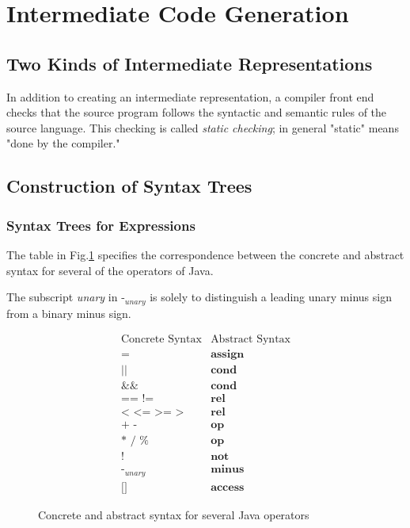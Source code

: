 \documentclass[a4paper,twoside]{book}
\begin{document}
\section{Intermediate Code Generation}
\subsection{Two Kinds of Intermediate Representations}

In addition to creating an intermediate representation, a compiler front end checks that the source program follows the syntactic and semantic rules of the source language. This checking is called \textit{static checking}; in general "static" means "done by  the compiler."

\subsection{Construction of Syntax Trees}
\subsubsection{Syntax Trees for Expressions}

The table in Fig.\;\ref{Figure:2.41}  specifies the correspondence between the concrete and abstract syntax for several of the operators of Java.

The subscript \textit{unary} in $\texttt{-}_{unary}$ is solely to distinguish a leading unary minus sign from a binary minus sign.

\begin{equation*}
    \begin{array}{cc}\text{Concrete Syntax}&\text{Abstract Syntax}\\\texttt{=} &\textbf{assign}\\\texttt{||} &\textbf{cond}\\\texttt{\&\&}&\textbf{cond}\\\texttt{== !=}&\textbf{rel}\\\texttt{< <= >= >}&\textbf{rel}\\\texttt{+ -}&\textbf{op}\\\texttt{* / \%}&\textbf{op}\\\texttt{!}&\textbf{not}\\\texttt{-}_{unary}&\textbf{minus}\\\texttt{[]}&\textbf{access}\end{array}
\end{equation*}
\begin{figure}[htbp]
    \caption{Concrete and abstract syntax for several Java operators}
    \label{Figure:2.41}
\end{figure}
\end{document}
